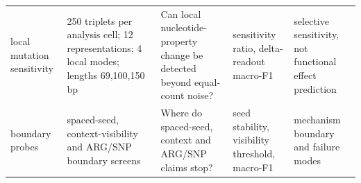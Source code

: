 \begin{tabular}{@{}p{}p{}p{}p{}p{}@{}}
local mutation sensitivity & 250 triplets per analysis cell; 12 representations; 4 local modes; lengths 69,100,150 bp & Can local nucleotide-property change be detected beyond equal-count noise? & sensitivity ratio, delta-readout macro-F1 & selective sensitivity, not functional effect prediction \\
boundary probes & spaced-seed, context-visibility and ARG/SNP boundary screens & Where do spaced-seed, context and ARG/SNP claims stop? & seed stability, visibility threshold, macro-F1 & mechanism boundary and failure modes \\
\bottomrule
\end{tabular}
